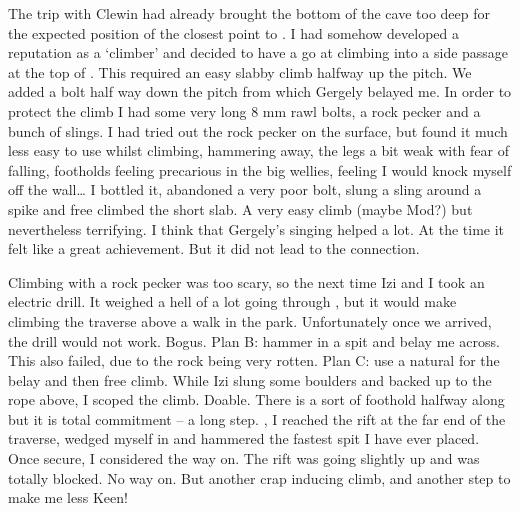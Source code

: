 

The trip with Clewin had already brought the bottom of the cave too deep
for the expected position of the closest point to . I had
somehow developed a reputation as a `climber' and decided to have a go
at climbing into a side passage at the top of . This
required an easy slabby climb halfway up the pitch. We added a bolt half
way down the pitch from which Gergely belayed me. In order to protect
the climb I had some very long 8 mm rawl bolts, a rock pecker and a
bunch of slings. I had tried out the rock pecker on the surface, but
found it much less easy to use whilst climbing, hammering away, the legs
a bit weak with fear of falling, footholds feeling precarious in the big wellies, feeling I would knock myself off the wall\ldots{} I bottled it,
abandoned a very poor bolt, slung a sling around a spike and free
climbed the short slab. A very easy climb (maybe Mod?) but nevertheless
terrifying. I think that Gergely's singing helped a lot. At the time it
felt like a great achievement. But it did not lead to the connection.




Climbing with a rock pecker was too scary, so the next time Izi and I
took an electric drill. It weighed a hell of a lot going through
, but it would make climbing the traverse above
 a walk in the park. Unfortunately once we arrived, the
drill would not work. Bogus. Plan B: hammer in a spit and belay me
across. This also failed, due to the rock being very rotten. Plan C: use
a natural for the belay and then free climb. While Izi slung some
boulders and backed up to the rope above, I scoped the climb. Doable.
There is a sort of foothold halfway along but it is total commitment --
a long step. , I reached the rift at the far end of
the traverse, wedged myself in and hammered the fastest spit I have ever
placed. Once secure, I considered the way on. The rift was going
slightly up and was totally blocked. No way on. But another crap
inducing climb, and another step to make me less Keen!

